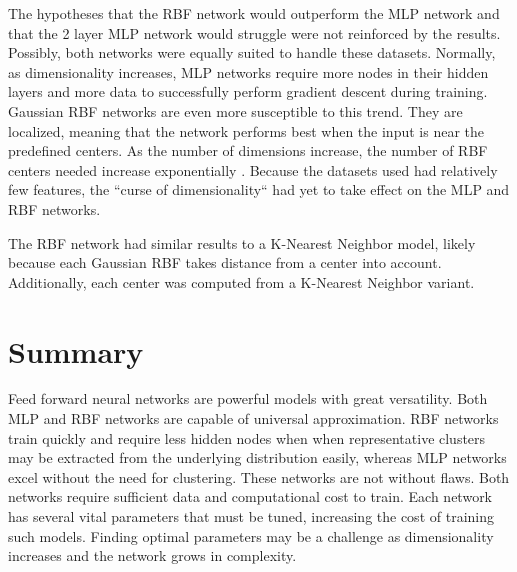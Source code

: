 \documentclass[twoside,10pt]{article}
\begin{document}
	The hypotheses that the RBF network would outperform the MLP network and that the 2 layer MLP network would struggle were not reinforced by the results. Possibly, both networks were equally suited to handle these datasets. Normally, as dimensionality increases, MLP networks require more nodes in their hidden layers and more data to successfully perform gradient descent during training. Gaussian RBF networks are even more susceptible to this trend. They are localized, meaning that the network performs best when the input is near the predefined centers. As the number of dimensions increase, the number of RBF centers needed increase exponentially \citep{rbf}. Because the datasets used had relatively few features, the ``curse of dimensionality`` had yet to take effect on the MLP and RBF networks.

	The RBF network had similar results to a K-Nearest Neighbor model, likely because each Gaussian RBF takes distance from a center into account. Additionally, each center was computed from a K-Nearest Neighbor variant.

\section{Summary}

	Feed forward neural networks are powerful models with great versatility. Both MLP and RBF networks are capable of universal approximation. RBF networks train quickly and require less hidden nodes when when representative clusters may be extracted from the underlying distribution easily, whereas MLP networks excel without the need for clustering. These networks are not without flaws. Both networks require sufficient data and computational cost to train. Each network has several vital parameters that must be tuned, increasing the cost of training such models. Finding optimal parameters may be a challenge as dimensionality increases and the network grows in complexity.

\newpage


\end{document}
